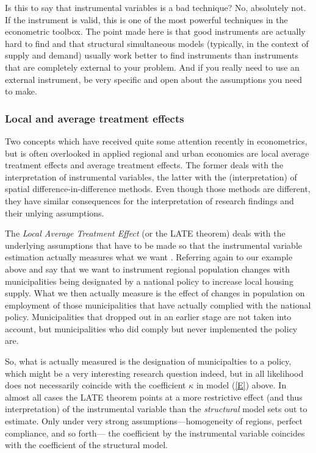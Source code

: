 \documentclass[fleqn,10pt]{SelfArx} %
\begin{document}
Is this to say that instrumental variables is a bad technique? No, absolutely
not. If the instrument is valid, this is one of the most powerful techniques in
the econometric toolbox. The point made here is that good instruments are
actually hard to find and that structural simultaneous models (typically, in the
context of supply and demand) usually work better to find instruments than
instruments that are completely external to your problem. And if you really need
to use an external instrument, be very specific and open about the assumptions
you need to make.

\subsubsection{Local and average treatment effects}

Two concepts which have received quite some attention recently in econometrics, but is often
overlooked in applied regional and urban economics are local average treatment
effects and average treatment effects. The former deals with the interpretation
of instrumental variables, the latter with the (interpretation) of spatial
difference-in-difference methods. Even though those methods are different, they
have similar consequences for the interpretation of research findings and their
unlying assumptions.

The \emph{Local Average Treatment Effect} (or the LATE theorem) deals with the underlying
assumptions that have to be made so that the instrumental variable estimation
actually measures what we want \citep[see][]{imbens1994identification}. Referring again to our example above and say
that we want to instrument regional population changes with municipalities being
designated by a national policy to increase local housing supply. What we then
actually measure is the effect of changes in population on employment of those
municipalities that have actually complied with the national policy.
Municipalities that dropped out in an earlier stage are not taken into account,
but municipalities who did comply but never implemented the policy are.

So, what is actually measured is the designation of municipalties to a policy,
which might be a very interesting research question indeed, but in all
likelihood does not necessarily coincide with the coefficient $\kappa$ in
model (\ref{E}) above. In almost all cases the LATE theorem points at a more
restrictive effect (and thus interpretation) of the instrumental variable than
the \emph{structural} model sets out to estimate. Only under very strong
assumptions---homogeneity of regions, perfect compliance, and so forth---
the coefficient by the instrumental variable coincides with the coefficient of
the structural model.  
\end{document}
